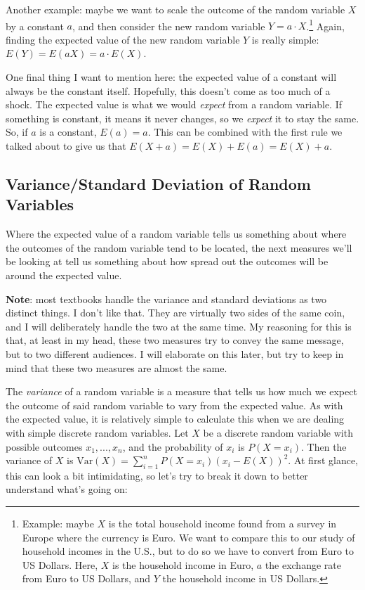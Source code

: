 \documentclass[]{book}
\let\rmarkdownfootnote\footnote%
\def\footnote{\protect\rmarkdownfootnote}
\theoremstyle{definition}
\theoremstyle{definition}
\theoremstyle{definition}
\theoremstyle{remark}
\begin{document}
Another example: maybe we want to scale the outcome of the random variable \(X\) by a constant \(a\), and then consider the new random variable \(Y = a\cdot X\).\footnote{Example: maybe \(X\) is the total household income found from a survey in Europe where the currency is Euro. We want to compare this to our study of household incomes in the U.S., but to do so we have to convert from Euro to US Dollars. Here, \(X\) is the household income in Euro, \(a\) the exchange rate from Euro to US Dollars, and \(Y\) the household income in US Dollars.} Again, finding the expected value of the new random variable \(Y\) is really simple: \(E(Y) = E(aX) = a\cdot E(X)\).

One final thing I want to mention here: the expected value of a constant will always be the constant itself. Hopefully, this doesn't come as too much of a shock. The expected value is what we would \emph{expect} from a random variable. If something is constant, it means it never changes, so we \emph{expect} it to stay the same. So, if \(a\) is a constant, \(E(a) = a\). This can be combined with the first rule we talked about to give us that \(E(X + a) = E(X) + E(a) = E(X) + a\).

\hypertarget{variancestandard-deviation-of-random-variables}{%
\subsection{Variance/Standard Deviation of Random Variables}\label{variancestandard-deviation-of-random-variables}}

Where the expected value of a random variable tells us something about where the outcomes of the random variable tend to be located, the next measures we'll be looking at tell us something about how spread out the outcomes will be around the expected value.

\textbf{Note}: most textbooks handle the variance and standard deviations as two distinct things. I don't like that. They are virtually two sides of the same coin, and I will deliberately handle the two at the same time. My reasoning for this is that, at least in my head, these two measures try to convey the same message, but to two different audiences. I will elaborate on this later, but try to keep in mind that these two measures are almost the same.

The \emph{variance} of a random variable is a measure that tells us how much we expect the outcome of said random variable to vary from the expected value. As with the expected value, it is relatively simple to calculate this when we are dealing with simple discrete random variables. Let \(X\) be a discrete random variable with possible outcomes \(x_1, ..., x_n\), and the probability of \(x_i\) is \(P(X = x_i)\). Then the variance of \(X\) is \(\text{Var}(X) = \sum_{i=1}^n P(X = x_i)(x_i - E(X))^2\). At first glance, this can look a bit intimidating, so let's try to break it down to better understand what's going on:
\end{document}
